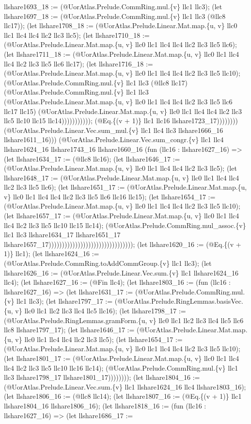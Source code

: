\documentclass[11pt]{article}
\begin{document}
llshare1693\_18 := (@UorAtlas.Prelude.CommRing.mul.\{v\} llc1 llc3); (let llshare1697\_18 := (@UorAtlas.Prelude.CommRing.mul.\{v\} llc1 llc3 (@llc8 llc17)); (let llshare1708\_18 := (@UorAtlas.Prelude.Linear.Mat.map.\{u, v\} llc0 llc1 llc4 llc4 llc2 llc3 llc5); (let llshare1710\_18 := (@UorAtlas.Prelude.Linear.Mat.map.\{u, v\} llc0 llc1 llc4 llc4 llc2 llc3 llc5 llc6); (let llshare1711\_18 := (@UorAtlas.Prelude.Linear.Mat.map.\{u, v\} llc0 llc1 llc4 llc4 llc2 llc3 llc5 llc6 llc17); (let llshare1716\_18 := (@UorAtlas.Prelude.Linear.Mat.map.\{u, v\} llc0 llc1 llc4 llc4 llc2 llc3 llc5 llc10); (@UorAtlas.Prelude.CommRing.mul.\{v\} llc1 llc3 (@llc8 llc17) (@UorAtlas.Prelude.CommRing.mul.\{v\} llc1 llc3 (@UorAtlas.Prelude.Linear.Mat.map.\{u, v\} llc0 llc1 llc4 llc4 llc2 llc3 llc5 llc6 llc17 llc15) (@UorAtlas.Prelude.Linear.Mat.map.\{u, v\} llc0 llc1 llc4 llc4 llc2 llc3 llc5 llc10 llc15 llc14))))))))))); (@Eq.\{(v + 1)\} llc1 llc16 llshare1723\_17)))))))) (@UorAtlas.Prelude.Linear.Vec.sum\_mul.\{v\} llc1 llc4 llc3 llshare1666\_16 llshare1611\_16))) (@UorAtlas.Prelude.Linear.Vec.sum\_congr.\{v\} llc1 llc4 llshare1624\_16 llshare1743\_16 llshare1660\_16 (fun (llc16 : llshare1627\_16) => (let llshare1634\_17 := (@llc8 llc16); (let llshare1646\_17 := (@UorAtlas.Prelude.Linear.Mat.map.\{u, v\} llc0 llc1 llc4 llc4 llc2 llc3 llc5); (let llshare1648\_17 := (@UorAtlas.Prelude.Linear.Mat.map.\{u, v\} llc0 llc1 llc4 llc4 llc2 llc3 llc5 llc6); (let llshare1651\_17 := (@UorAtlas.Prelude.Linear.Mat.map.\{u, v\} llc0 llc1 llc4 llc4 llc2 llc3 llc5 llc6 llc16 llc15); (let llshare1654\_17 := (@UorAtlas.Prelude.Linear.Mat.map.\{u, v\} llc0 llc1 llc4 llc4 llc2 llc3 llc5 llc10); (let llshare1657\_17 := (@UorAtlas.Prelude.Linear.Mat.map.\{u, v\} llc0 llc1 llc4 llc4 llc2 llc3 llc5 llc10 llc15 llc14); (@UorAtlas.Prelude.CommRing.mul\_assoc.\{v\} llc1 llc3 llshare1634\_17 llshare1651\_17 llshare1657\_17)))))))))))))))))))))))))))))))); (let llshare1620\_16 := (@Eq.\{(v + 1)\} llc1); (let llshare1624\_16 := (@UorAtlas.Prelude.CommRing.toAddCommGroup.\{v\} llc1 llc3); (let llshare1626\_16 := (@UorAtlas.Prelude.Linear.Vec.sum.\{v\} llc1 llshare1624\_16 llc4); (let llshare1627\_16 := (@Fin llc4); (let llshare1803\_16 := (fun (llc16 : llshare1627\_16) => (let llshare1631\_17 := (@UorAtlas.Prelude.CommRing.mul.\{v\} llc1 llc3); (let llshare1797\_17 := (@UorAtlas.Prelude.RingLemmas.basisVec.\{u, v\} llc0 llc1 llc2 llc3 llc4 llc5 llc16); (let llshare1798\_17 := (@UorAtlas.Prelude.RingLemmas.gramForm.\{u, v\} llc0 llc1 llc2 llc3 llc4 llc5 llc6 llc8 llshare1797\_17); (let llshare1646\_17 := (@UorAtlas.Prelude.Linear.Mat.map.\{u, v\} llc0 llc1 llc4 llc4 llc2 llc3 llc5); (let llshare1654\_17 := (@UorAtlas.Prelude.Linear.Mat.map.\{u, v\} llc0 llc1 llc4 llc4 llc2 llc3 llc5 llc10); (let llshare1801\_17 := (@UorAtlas.Prelude.Linear.Mat.map.\{u, v\} llc0 llc1 llc4 llc4 llc2 llc3 llc5 llc10 llc16 llc14); (@UorAtlas.Prelude.CommRing.mul.\{v\} llc1 llc3 llshare1798\_17 llshare1801\_17)))))))); (let llshare1804\_16 := (@UorAtlas.Prelude.Linear.Vec.sum.\{v\} llc1 llshare1624\_16 llc4 llshare1803\_16); (let llshare1806\_16 := (@llc8 llc14); (let llshare1807\_16 := (@Eq.\{(v + 1)\} llc1 llshare1804\_16 llshare1806\_16); (let llshare1818\_16 := (fun (llc16 : llshare1627\_16) => (let llshare1686\_17 := 
\end{document}
